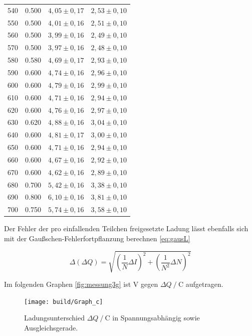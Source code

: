 \begin{table}[H]
\begin{tabular}{S[table-format=3.0] S[table-format=1.3] S  S}
      540  &  0.500 &  {$4,05 \pm 0,17$} &  {$2,53 \pm 0,10$}       \\
      550  &  0.500 &  {$4,01 \pm 0,16$} &  {$2,51 \pm 0,10$}       \\
      560  &  0.500 &  {$3,99 \pm 0,16$} &  {$2,49 \pm 0,10$}       \\
      570  &  0.500 &  {$3,97 \pm 0,16$} &  {$2,48 \pm 0,10$}       \\
      580  &  0.580 &  {$4,69 \pm 0,17$} &  {$2,93 \pm 0,10$}       \\
      590  &  0.600 &  {$4,74 \pm 0,16$} &  {$2,96 \pm 0,10$}       \\
      600  &  0.600 &  {$4,79 \pm 0,16$} &  {$2,99 \pm 0,10$}       \\
      610  &  0.600 &  {$4,71 \pm 0,16$} &  {$2,94 \pm 0,10$}       \\
      620  &  0.600 &  {$4,76 \pm 0,16$} &  {$2,97 \pm 0,10$}       \\
      630  &  0.620 &  {$4,88 \pm 0,16$} &  {$3,04 \pm 0,10$}       \\
      640  &  0.600 &  {$4,81 \pm 0,17$} &  {$3,00 \pm 0,10$}       \\
      650  &  0.600 &  {$4,71 \pm 0,16$} &  {$2,94 \pm 0,10$}       \\
      660  &  0.600 &  {$4,67 \pm 0,16$} &  {$2,92 \pm 0,10$}       \\
      670  &  0.600 &  {$4,62 \pm 0,16$} &  {$2,89 \pm 0,10$}       \\
      680  &  0.700 &  {$5,42 \pm 0,16$} &  {$3,38 \pm 0,10$}       \\
      690  &  0.800 &  {$6,10 \pm 0,16$} &  {$3,81 \pm 0,10$}       \\
      700  &  0.750 &  {$5,74 \pm 0,16$} &  {$3,58 \pm 0,10$}       \\ 
    \bottomrule
    \end{tabular}
\end{table}
\newpage

Der Fehler der pro einfallenden Teilchen freigesetzte Ladung lässt ebenfalls sich mit der Gaußschen-Fehlerfortpflanzung berechnen \eqref{eq:gausL}

\begin{equation}
    \Delta \left( \Delta Q \right) = \sqrt{  \left(   \frac{1}{N} \Delta I \right)^2   + \left( \frac{1}{N^2} \Delta N  \right)^2 }
    \label{eq:gausL}
\end{equation}


Im folgenden Graphen \autoref{fig:messung3g} ist $ \unit{\volt}$ gegen $\Delta Q \mathbin{/} \unit{\coulomb}$ aufgetragen.
\begin{figure}[H]
  \centering
  \texttt{[image: build/Graph\_c]}
  \caption{Ladungsunterschied $\Delta Q \mathbin{/} \unit{\coulomb}$ in Spannungsabhängig sowie Ausgleichsgerade.}
  \label{fig:messung3g}
\end{figure}

